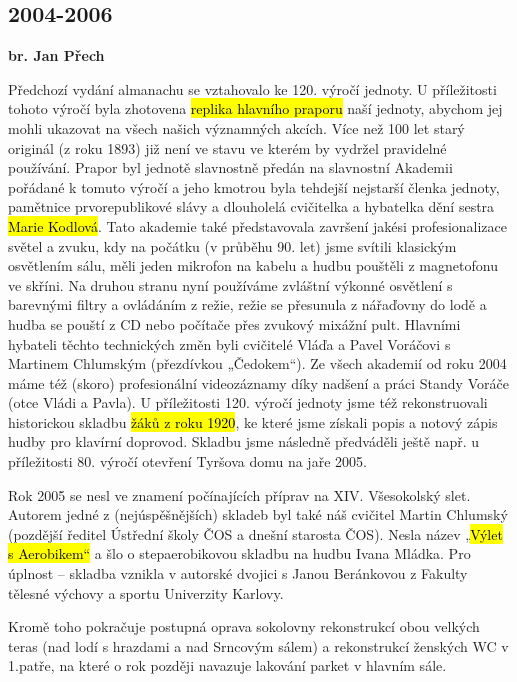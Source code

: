\subsection{2004-2006}\label{section}

\textbf{br. Jan Přech}

Předchozí vydání almanachu se vztahovalo ke 120. výročí jednoty. U
příležitosti tohoto výročí byla zhotovena \hl{replika hlavního praporu}
naší jednoty, abychom jej mohli ukazovat na všech našich významných
akcích. Více než 100 let starý originál (z roku 1893) již není ve stavu
ve kterém by vydržel pravidelné používání. Prapor byl jednotě slavnostně
předán na slavnostní Akademii pořádané k tomuto výročí a jeho kmotrou
byla tehdejší nejstarší členka jednoty, pamětnice prvorepublikové slávy
a dlouholelá cvičitelka a hybatelka dění sestra \hl{Marie Kodlová}. Tato
akademie také představovala završení jakési profesionalizace světel a
zvuku, kdy na počátku (v průběhu 90. let) jsme svítili klasickým
osvětlením sálu, měli jeden mikrofon na kabelu a hudbu pouštěli z
magnetofonu ve skříni. Na druhou stranu nyní používáme zvláštní výkonné
osvětlení s barevnými filtry a ovládáním z režie, režie se přesunula z
nářaďovny do lodě a hudba se pouští z CD nebo počítače přes zvukový
mixážní pult. Hlavními hybateli těchto technických změn byli cvičitelé
Vláďa a Pavel Voráčovi s Martinem Chlumským (přezdívkou „Čedokem``). Ze
všech akademií od roku 2004 máme též (skoro) profesionální videozáznamy
díky nadšení a práci Standy Voráče (otce Vládi a Pavla). U příležitosti
120. výročí jednoty jsme též rekonstruovali historickou skladbu \hl{žáků
z roku 1920}, ke které jsme získali popis a notový zápis hudby pro
klavírní doprovod. Skladbu jsme následně předváděli ještě např. u
příležitosti 80. výročí otevření Tyršova domu na jaře 2005.

Rok 2005 se nesl ve znamení počínajících příprav na XIV. Všesokolský
slet. Autorem jedné z (nejúspěšnějších) skladeb byl také náš cvičitel
Martin Chlumský (pozdější ředitel Ústřední školy ČOS a dnešní starosta
ČOS). Nesla název „\hl{Výlet s Aerobikem``} a šlo o stepaerobikovou
skladbu na hudbu Ivana Mládka. Pro úplnost -- skladba vznikla v autorské
dvojici s Janou Beránkovou z Fakulty tělesné výchovy a sportu Univerzity
Karlovy.

Kromě toho pokračuje postupná oprava sokolovny rekonstrukcí obou velkých
teras (nad lodí s hrazdami a nad Srncovým sálem) a rekonstrukcí ženských
WC v 1.patře, na které o rok později navazuje lakování parket v hlavním
sále.


